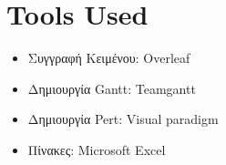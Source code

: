\documentclass[11pt]{scrartcl} %
\begin{document}
\section{Tools Used}

\begin{itemize}
    \item Συγγραφή Κειμένου: Overleaf
    \item Δημιουργία Gantt: Teamgantt
    \item Δημιουργία Pert: Visual paradigm
    \item Πίνακες: Microsoft Excel
\end{itemize}


% 
\end{document}
